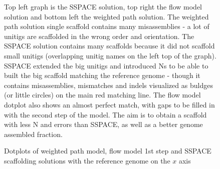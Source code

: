 \documentclass[12pt]{article}
\begin{document}
\begin{figure}[h!]
\caption{Dotplots of weighted path model, flow model 1st step and SSPACE scaffolding solutions with the reference genome on the $x$ axis}
\footnotesize Top left graph is the SSPACE solution, top right the flow model solution and bottom left the weighted path solution. The weighted path solution single scaffold contains many misassemblies - a lot of unitigs are scaffolded in the wrong order and orientation. The SSPACE solution contains many scaffolds because it did not scaffold small unitigs (overlapping unitig names on the left top of the graph). SSPACE extended the big unitigs and introduced Ns to be able to built the big scaffold matching the reference genome - though it contains misassemblies, mismatches and indels visualized as buldges (or little circles) on the main red matching line. The flow model dotplot also shows an almost perfect match, with gaps to be filled in with the second step of the model. The aim is to obtain a scaffold with less N and errors than SSPACE, as well as a better genome assembled fraction. 
\begin{center}
\label{fig:dotpinus}
\end{center}
\end{figure}
\end{document}
